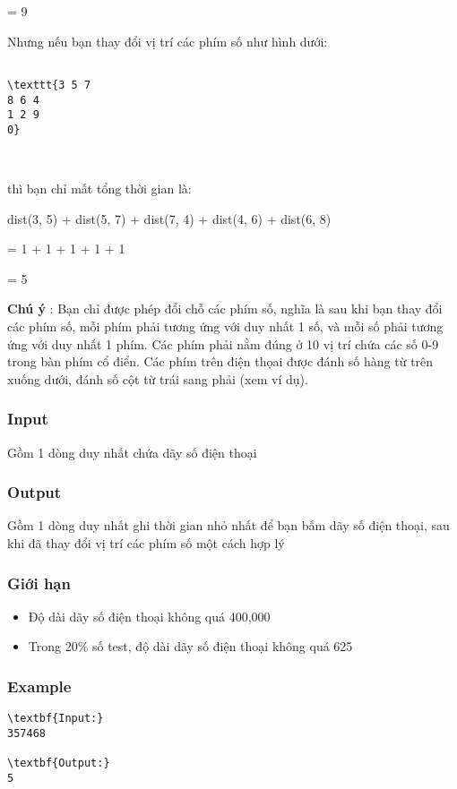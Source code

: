 = 9

Nhưng nếu bạn thay đổi vị trí các phím số như hình dưới:
\begin{verbatim}

\texttt{3 5 7
8 6 4
1 2 9
0}\end{verbatim}

 

thì bạn chỉ mất tổng thời gian là:

dist(3, 5) + dist(5, 7) + dist(7, 4) + dist(4, 6) + dist(6, 8)

= 1 + 1 + 1 + 1 + 1

= 5

\textbf{Chú ý } : Bạn chỉ được phép đổi chỗ các phím số, nghĩa là sau khi bạn thay đổi các phím số, mỗi phím phải tương ứng với duy nhất 1 số, và mỗi số phải tương ứng với duy nhất 1 phím. Các phím phải nằm đúng ở 10 vị trí chứa các số 0-9 trong bàn phím cổ điển. Các phím trên điện thọai được đánh số hàng từ trên xuống dưới, đánh số cột từ trái sang phải (xem ví dụ).

\subsubsection{Input}

Gồm 1 dòng duy nhất chứa dãy số điện thoại

\subsubsection{Output}

Gồm 1 dòng duy nhất ghi thời gian nhỏ nhất để bạn bấm dãy số điện thoại, sau khi đã thay đổi vị trí các phím số một cách hợp lý

\subsubsection{Giới hạn}
\begin{itemize}
	\item Độ dài dãy số điện thoại không quá 400,000
	\item Trong 20\% số test, độ dài dãy số điện thoại không quá 625
\end{itemize}

\subsubsection{Example}
\begin{verbatim}
\textbf{Input:}
357468

\textbf{Output:}
5\end{verbatim}
